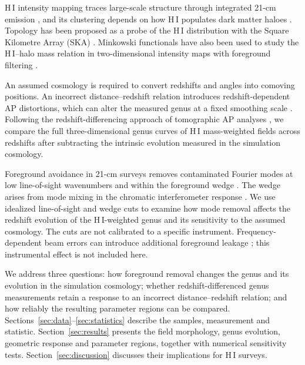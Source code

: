 H\,I intensity mapping traces large-scale structure through integrated 21-cm emission \citep{Battye2013IntensityMapping}, and its clustering depends on how H\,I populates dark matter haloes \citep{Villaescusa2018}. Topology has been proposed as a probe of the H\,I distribution with the Square Kilometre Array (SKA) \citep{Wang2015HITopologySKA}. Minkowski functionals have also been used to study the H\,I--halo mass relation in two-dimensional intensity maps with foreground filtering \citep{Spina2021HIHaloMF}.

An assumed cosmology is required to convert redshifts and angles into comoving positions. An incorrect distance--redshift relation introduces redshift-dependent AP distortions, which can alter the measured genus at a fixed smoothing scale \citep{AlcockPaczynski1979}. Following the redshift-differencing approach of tomographic AP analyses \citep{Li2014GradientAP,Li2016TomographicAP,Park2019EvolutionAP}, we compare the full three-dimensional genus curves of H\,I mass-weighted fields across redshifts after subtracting the intrinsic evolution measured in the simulation cosmology.

Foreground avoidance in 21-cm surveys removes contaminated Fourier modes at low line-of-sight wavenumbers and within the foreground wedge \citep{SeoHirata2016Wedge}. The wedge arises from mode mixing in the chromatic interferometer response \citep{Datta2010BrightSourceWedge,Morales2012ForegroundShapes}. We use idealized line-of-sight and wedge cuts to examine how mode removal affects the redshift evolution of the H\,I-weighted genus and its sensitivity to the assumed cosmology. The cuts are not calibrated to a specific instrument. Frequency-dependent beam errors can introduce additional foreground leakage \citep{Ding2024BeamCalibration}; this instrumental effect is not included here.

We address three questions: how foreground removal changes the genus and its evolution in the simulation cosmology; whether redshift-differenced genus measurements retain a response to an incorrect distance--redshift relation; and how reliably the resulting parameter regions can be compared. Sections~\ref{sec:data}--\ref{sec:statistics} describe the samples, measurement and statistic. Section~\ref{sec:results} presents the field morphology, genus evolution, geometric response and parameter regions, together with numerical sensitivity tests. Section~\ref{sec:discussion} discusses their implications for H\,I surveys.
